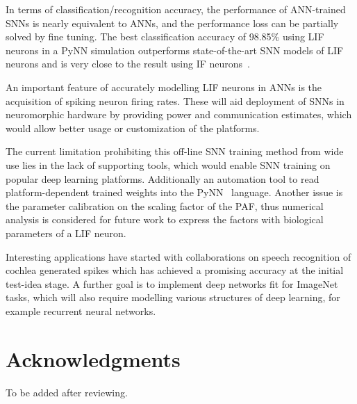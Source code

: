 \documentclass{article}
\begin{document}
In terms of classification/recognition accuracy, the performance of ANN-trained SNNs is nearly equivalent to ANNs, and the performance loss can be partially solved by fine tuning.
The best classification accuracy of 98.85\% using LIF neurons in a PyNN simulation outperforms state-of-the-art SNN models of LIF neurons and is very close to the result using IF neurons~\cite{diehl2015fast}.

An important feature of accurately modelling LIF neurons in ANNs is the acquisition of spiking neuron firing rates. These will aid deployment of SNNs in neuromorphic hardware by providing power and communication estimates, which would allow better usage or customization of the platforms.

The current limitation prohibiting this off-line SNN training method from wide use lies in the lack of supporting tools, which would enable SNN training on popular deep learning platforms. Additionally an automation tool to read platform-dependent trained weights into the PyNN~\cite{davison2008pynn} language.
Another issue is the parameter calibration on the scaling factor of the PAF, thus numerical analysis is considered for future work to express the factors with biological parameters of a LIF neuron.

Interesting applications have started with collaborations on speech recognition of cochlea generated spikes which has achieved a promising accuracy at the initial test-idea stage.
A further goal is to implement deep networks fit for ImageNet~\cite{deng2009imagenet} tasks, which will also require modelling various structures of deep learning, for example recurrent neural networks.

\section*{Acknowledgments}
To be added after reviewing.
\end{document}

